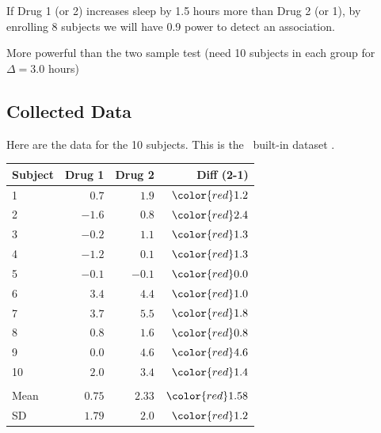 \bi
\item If Drug 1 (or 2) increases sleep by 1.5 hours more than Drug 2 (or 1), by enrolling 8 subjects we will have 0.9 power to detect an association.
\item More powerful than the two sample test (need 10 subjects in each group for $\Delta = 3.0$ hours)
\ei
\subsection{Collected Data}
Here are the data for the 10 subjects.  This is the \R\ built-in dataset .
 \begin{center}
 \begin{tabular}{lrrr}\hline\hline
Subject & Drug 1 & Drug 2 & {\color{red}Diff (2-1)}
\\ \hline
1 & $ 0.7$&$ 1.9$&$\color{red}1.2$\\
2 &$-1.6$&$ 0.8$&$\color{red}2.4$\\
3 &$-0.2$&$ 1.1$&$\color{red}1.3$\\
4 &$-1.2$&$ 0.1$&$\color{red}1.3$\\
5 &$-0.1$&$-0.1$&$\color{red}0.0$\\
6 &$ 3.4$&$ 4.4$&$\color{red}1.0$\\
7 &$ 3.7$&$ 5.5$&$\color{red}1.8$\\
8 &$ 0.8$&$ 1.6$&$\color{red}0.8$\\
9 &$ 0.0$&$ 4.6$&$\color{red}4.6$\\
10 &$ 2.0$&$ 3.4$&$\color{red}1.4$\\ \\
Mean & $ 0.75$&$ 2.33$&$\color{red}1.58$\\
SD & $ 1.79$&$ 2.0$&$\color{red}1.2$\\
\hline
\end{tabular}
\end{center}

